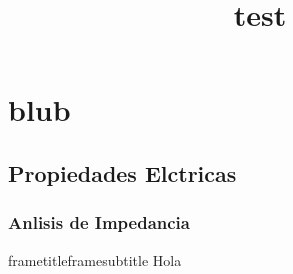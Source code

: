 \documentclass{beamer}
\title{test}
\begin{document}
\section{blub}
\subsection{Propiedades Elctricas}
\subsubsection{Anlisis de Impedancia}
\begin{frame}{frametitle}{framesubtitle}
Hola
\end{frame}
\end{document}
